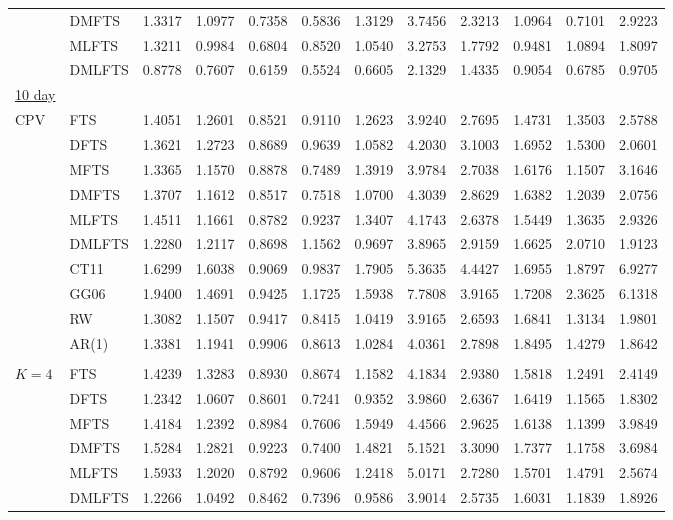 \documentclass[12pt,a4paper]{article}
\begin{document}
\begin{center}
\begin{small}
\begin{longtable}{@{}llrrrrrrrrrr@{}}
  & DMFTS & 1.3317 & 1.0977 & 0.7358 & 0.5836 & 1.3129 & 3.7456 & 2.3213 & 1.0964 & 0.7101 & 2.9223 \\ 
  & MLFTS & 1.3211 & 0.9984 & 0.6804 & 0.8520 & 1.0540 & 3.2753 & 1.7792 & 0.9481 & 1.0894 & 1.8097 \\ 
  & DMLFTS & 0.8778 & 0.7607 & 0.6159 & 0.5524 & 0.6605 & 2.1329 & 1.4335 & 0.9054 & 0.6785 & 0.9705 \\ 
\underline{10 day} \\
 CPV & FTS & 1.4051 & 1.2601 & 0.8521 & 0.9110 & 1.2623 & 3.9240 & 2.7695 & 1.4731 & 1.3503 & 2.5788 \\ 
  & DFTS & 1.3621 & 1.2723 & 0.8689 & 0.9639 & 1.0582 & 4.2030 & 3.1003 & 1.6952 & 1.5300 & 2.0601 \\ 
  & MFTS & 1.3365 & 1.1570 & 0.8878 & 0.7489 & 1.3919 & 3.9784 & 2.7038 & 1.6176 & 1.1507 & 3.1646 \\ 
  & DMFTS & 1.3707 & 1.1612 & 0.8517 & 0.7518 & 1.0700 & 4.3039 & 2.8629 & 1.6382 & 1.2039 & 2.0756 \\ 
  & MLFTS & 1.4511 & 1.1661 & 0.8782 & 0.9237 & 1.3407 & 4.1743 & 2.6378 & 1.5449 & 1.3635 & 2.9326 \\ 
  & DMLFTS & 1.2280 & 1.2117 & 0.8698 & 1.1562 & 0.9697 & 3.8965 & 2.9159 & 1.6625 & 2.0710 & 1.9123 \\ 
  & CT11 & 1.6299 & 1.6038 & 0.9069 & 0.9837 & 1.7905 & 5.3635 & 4.4427 & 1.6955 & 1.8797 & 6.9277 \\ 
  & GG06 & 1.9400 & 1.4691 & 0.9425 & 1.1725 & 1.5938 & 7.7808 & 3.9165 & 1.7208 & 2.3625 & 6.1318 \\ 
  & RW & 1.3082 & 1.1507 & 0.9417 & 0.8415 & 1.0419 & 3.9165 & 2.6593 & 1.6841 & 1.3134 & 1.9801 \\ 
  & AR(1) & 1.3381 & 1.1941 & 0.9906 & 0.8613 & 1.0284 & 4.0361 & 2.7898 & 1.8495 & 1.4279 & 1.8642 \\
\\
 $K=4$ & FTS & 1.4239 & 1.3283 & 0.8930 & 0.8674 & 1.1582 & 4.1834 & 2.9380 & 1.5818 & 1.2491 & 2.4149 \\ 
  & DFTS & 1.2342 & 1.0607 & 0.8601 & 0.7241 & 0.9352 & 3.9860 & 2.6367 & 1.6419 & 1.1565 & 1.8302 \\ 
  & MFTS & 1.4184 & 1.2392 & 0.8984 & 0.7606 & 1.5949 & 4.4566 & 2.9625 & 1.6138 & 1.1399 & 3.9849 \\ 
  & DMFTS & 1.5284 & 1.2821 & 0.9223 & 0.7400 & 1.4821 & 5.1521 & 3.3090 & 1.7377 & 1.1758 & 3.6984 \\ 
  & MLFTS & 1.5933 & 1.2020 & 0.8792 & 0.9606 & 1.2418 & 5.0171 & 2.7280 & 1.5701 & 1.4791 & 2.5674 \\ 
  & DMLFTS & 1.2266 & 1.0492 & 0.8462 & 0.7396 & 0.9586 & 3.9014 & 2.5735 & 1.6031 & 1.1839 & 1.8926 \\ 
   \bottomrule
\end{longtable}
\end{small}
\end{center}
\end{document}

